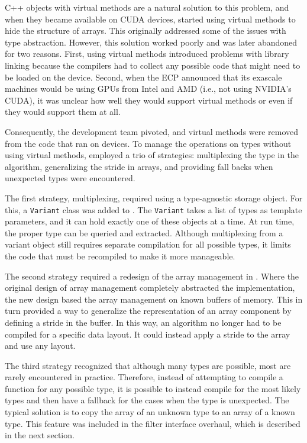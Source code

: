 C++ objects with virtual methods are a natural solution to this problem, and when they became available on CUDA devices, \vtkm started using virtual methods to hide the structure of arrays.
This originally addressed some of the issues with type abstraction.
However, this solution worked poorly and was later abandoned for two reasons.
First, using virtual methods introduced problems with library linking because the compilers had to collect any possible code that might need to be loaded on the device.
Second, when the ECP announced that its exascale machines would be using GPUs from Intel and AMD (i.e., not using NVIDIA's CUDA), it was unclear how well they would support virtual methods or even if they would support them at all.

Consequently, the \vtkm development team pivoted, and
virtual methods were removed from the \vtkm code that ran on devices.
To manage the operations on types without using virtual methods, \vtkm employed a trio of strategies: multiplexing the type in the algorithm, generalizing the stride in arrays, and providing fall backs when unexpected types were encountered.

The first strategy, multiplexing, required using a type-agnostic storage object.
For this, a \texttt{Variant} class was added to \vtkm.
The \texttt{Variant} takes a list of types as template parameters, and it can hold exactly one of these objects at a time.
At run time, the proper type can be queried and extracted.
Although multiplexing from a variant object still requires separate compilation for all possible types, it limits the code that must be recompiled to make it more manageable.

The second strategy required a redesign of the array management in \vtkm.
Where the original design of array management completely abstracted the implementation, the new design based the array management on known buffers of memory.
This in turn provided a way to generalize the representation of an array component by defining a stride in the buffer.
In this way, an algorithm no longer had to be compiled for a specific data layout.
It could instead apply a stride to the array and use any layout.

The third strategy recognized that although many types are possible, most are rarely encountered in practice.
Therefore, instead of attempting to compile a function for any possible type, it is possible to instead compile for the most likely types and then have a fallback for the cases when the type is unexpected.
The typical solution is to copy the array of an unknown type to an array of a known type.
This feature was included in the filter interface overhaul, which is described in the next section.

